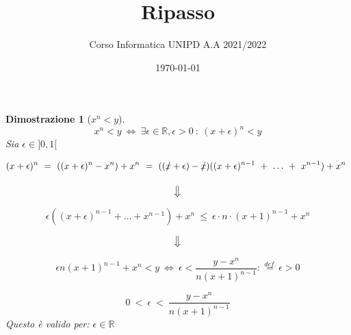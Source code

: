 \documentclass[12pt, a4paper]{article}
\title{Ripasso}
\author{Corso Informatica UNIPD A.A 2021/2022}
\date{\today}
\theoremstyle{break}
\theoremstyle{lemma}
\theoremstyle{lemma}
\newtheorem{dimo}{Dimostrazione}
\theoremstyle{lemma}
\newcommand{\R}{\mathbb{R}}
\begin{document}
\maketitle

\begin{dimo}[$x^n < y$]

	\begin{equation}
	x^n < y \ \iff\ \exists\epsilon \in \R, 
	\epsilon > 0 \ :\ (x + \epsilon)^n < y
	\end{equation}
Sia $\epsilon \in ]0,1[$

	\begin{equation}
	(x + \epsilon)^n\ =\ ((x + \epsilon)^n - x^n) + x^n\ =\
	((\xout{x} + \epsilon)- \xout{x})((x+ \epsilon)^{n-1}\ +\	
	\dots\ +\ x^{n-1}) + x^n\
	\end{equation}
	
	\begin{equation}
	\big\Downarrow
	\end{equation}

	\begin{equation}
	\epsilon ( (x + \epsilon)^{n-1} + \dots + x^{n-1}) + x^n\ \leq\
	\epsilon \cdot n \cdot (x + 1)^{n-1} + x^n
	\end{equation}

	\begin{equation}
	\big\Downarrow
	\end{equation}
	
	\begin{equation}
	\epsilon n (x+1)^{n-1} + x^n < y \ \iff\ 
	\epsilon < \frac{y - x^n}{n(x+1)^{n-1}} : \overset{def.}{=} \epsilon > 0
	\end{equation}

	\begin{equation}
	0\ <\ \epsilon\ <\ \frac{y - x^n}{n(x+1)^{n-1}} 	
	\end{equation}
Questo è valido per: $ \epsilon \in \R $ 

		
\end{dimo}
\end{document}
